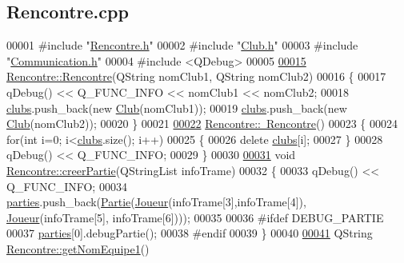 \hypertarget{_rencontre_8cpp_source}{}\subsection{Rencontre.\+cpp}

\begin{DoxyCode}
00001 \textcolor{preprocessor}{#include "\hyperlink{_rencontre_8h}{Rencontre.h}"}
00002 \textcolor{preprocessor}{#include "\hyperlink{_club_8h}{Club.h}"}
00003 \textcolor{preprocessor}{#include "\hyperlink{_communication_8h}{Communication.h}"}
00004 \textcolor{preprocessor}{#include <QDebug>}
00005 
\hyperlink{class_rencontre_aab1bbf3ea211e00186ab7f866994b77a}{00015} \hyperlink{class_rencontre_aab1bbf3ea211e00186ab7f866994b77a}{Rencontre::Rencontre}(QString nomClub1, QString nomClub2)
00016 \{
00017     qDebug() << Q\_FUNC\_INFO << nomClub1 << nomClub2;
00018     \hyperlink{class_rencontre_a12f6cef62070ecb095971e704a9d92a6}{clubs}.push\_back(\textcolor{keyword}{new} \hyperlink{class_club}{Club}(nomClub1));
00019     \hyperlink{class_rencontre_a12f6cef62070ecb095971e704a9d92a6}{clubs}.push\_back(\textcolor{keyword}{new} \hyperlink{class_club}{Club}(nomClub2));
00020 \}
00021 
\hyperlink{class_rencontre_a437de7d5f9adced5124dcfdd13e504d3}{00022} \hyperlink{class_rencontre_a437de7d5f9adced5124dcfdd13e504d3}{Rencontre::~Rencontre}()
00023 \{
00024     \textcolor{keywordflow}{for}(\textcolor{keywordtype}{int} i=0; i<\hyperlink{class_rencontre_a12f6cef62070ecb095971e704a9d92a6}{clubs}.size(); i++)
00025     \{
00026         \textcolor{keyword}{delete} \hyperlink{class_rencontre_a12f6cef62070ecb095971e704a9d92a6}{clubs}[i];
00027     \}
00028     qDebug() << Q\_FUNC\_INFO;
00029 \}
00030 
\hyperlink{class_rencontre_a8eb8eb61ed543925626e7680a1ecef5b}{00031} \textcolor{keywordtype}{void} \hyperlink{class_rencontre_a8eb8eb61ed543925626e7680a1ecef5b}{Rencontre::creerPartie}(QStringList infoTrame)
00032 \{
00033     qDebug() << Q\_FUNC\_INFO;
00034     \hyperlink{class_rencontre_a6b52ccf9b5d083718928b207ae5316fe}{parties}.push\_back(\hyperlink{class_partie}{Partie}(\hyperlink{class_joueur}{Joueur}(infoTrame[3],infoTrame[4]), 
      \hyperlink{class_joueur}{Joueur}(infoTrame[5], infoTrame[6])));
00035 
00036 \textcolor{preprocessor}{    #ifdef DEBUG\_PARTIE}
00037     \hyperlink{class_rencontre_a6b52ccf9b5d083718928b207ae5316fe}{parties}[0].debugPartie();
00038 \textcolor{preprocessor}{    #endif}
00039 \}
00040 
\hyperlink{class_rencontre_a50df24caf57437d8eaaadae43ff846ec}{00041} QString \hyperlink{class_rencontre_a50df24caf57437d8eaaadae43ff846ec}{Rencontre::getNomEquipe1}()

\end{DoxyCode}
